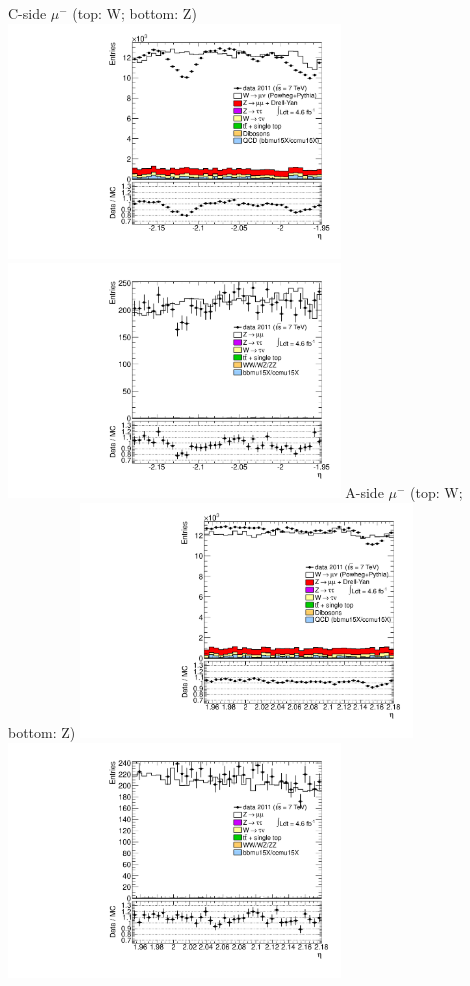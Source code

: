  {
\colb[T]
C-side $\mu^{-}$ (top: W; bottom: Z)
\centering
\includegraphics[width=0.66\textwidth]{dates/20130306/figures/both/W_10_C_stack_l_eta_POS} \\
\includegraphics[width=0.66\textwidth]{dates/20130306/figures/both/Ztinv_10_C_stack_lP_eta_ALL.pdf}
A-side $\mu^{-}$ (top: W; bottom: Z)
\centering
\includegraphics[width=0.66\textwidth]{dates/20130306/figures/both/W_10_A_stack_l_eta_POS} \\
\includegraphics[width=0.66\textwidth]{dates/20130306/figures/both/Ztinv_10_A_stack_lP_eta_ALL.pdf} 
\cole
}

